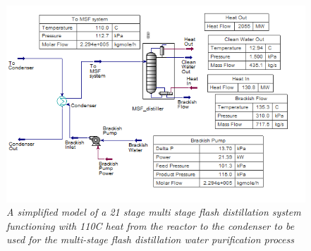 \documentclass[12pt]{UIdahoMastersThesis}
\begin{document}
\begin{figure}
\includegraphics[width=\textwidth]{110MSF.PNG}
\caption{\small \sl A simplified model of a 21 stage multi stage flash distillation system functioning with 110\degree C heat from the reactor to the condenser to be used for the multi-stage flash distillation water purification process}
\end{figure}
\end{document}
